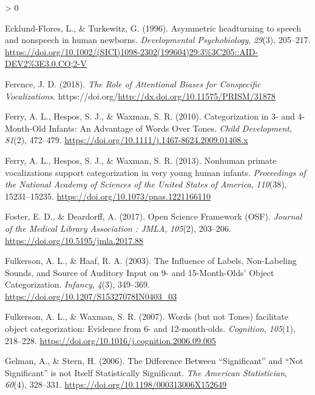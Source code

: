 \documentclass[
  english,
  man]{apa6}
\newlength{\cslhangindent}
\newenvironment{CSLReferences}[2] %
 {%
  \setlength{\parindent}{0pt}
  \ifodd #1 \everypar{\setlength{\hangindent}{\cslhangindent}}\ignorespaces\fi
  \ifnum #2 > 0
  \setlength{\parskip}{#2\baselineskip}
  \fi
 }%
 {}
\begin{document}
\begin{CSLReferences}{1}{0}
\leavevmode\hypertarget{ref-ecklund-flores_asymmetric_1996}{}%
Ecklund-Flores, L., \& Turkewitz, G. (1996). Asymmetric headturning to speech and nonspeech in human newborns. \emph{Developmental Psychobiology}, \emph{29}(3), 205--217. \url{https://doi.org/10.1002/(SICI)1098-2302(199604)29:3\%3C205::AID-DEV2\%3E3.0.CO;2-V}

\leavevmode\hypertarget{ref-ference_role_2018}{}%
Ference, J. D. (2018). \emph{The {Role} of {Attentional} {Biases} for {Conspecific} {Vocalizations}}. https://doi.org/\url{http://dx.doi.org/10.11575/PRISM/31878}

\leavevmode\hypertarget{ref-ferry_categorization_2010}{}%
Ferry, A. L., Hespos, S. J., \& Waxman, S. R. (2010). Categorization in 3- and 4-{Month}-{Old} {Infants}: {An} {Advantage} of {Words} {Over} {Tones}. \emph{Child Development}, \emph{81}(2), 472--479. \url{https://doi.org/10.1111/j.1467-8624.2009.01408.x}

\leavevmode\hypertarget{ref-ferry_nonhuman_2013}{}%
Ferry, A. L., Hespos, S. J., \& Waxman, S. R. (2013). Nonhuman primate vocalizations support categorization in very young human infants. \emph{Proceedings of the National Academy of Sciences of the United States of America}, \emph{110}(38), 15231--15235. \url{https://doi.org/10.1073/pnas.1221166110}

\leavevmode\hypertarget{ref-foster_open_2017}{}%
Foster, E. D., \& Deardorff, A. (2017). Open {Science} {Framework} ({OSF}). \emph{Journal of the Medical Library Association : JMLA}, \emph{105}(2), 203--206. \url{https://doi.org/10.5195/jmla.2017.88}

\leavevmode\hypertarget{ref-fulkerson_influence_2003}{}%
Fulkerson, A. L., \& Haaf, R. A. (2003). The {Influence} of {Labels}, {Non}-{Labeling} {Sounds}, and {Source} of {Auditory} {Input} on 9- and 15-{Month}-{Olds}' {Object} {Categorization}. \emph{Infancy}, \emph{4}(3), 349--369. \url{https://doi.org/10.1207/S15327078IN0403_03}

\leavevmode\hypertarget{ref-fulkerson_words_2007}{}%
Fulkerson, A. L., \& Waxman, S. R. (2007). Words (but not {Tones}) facilitate object categorization: {Evidence} from 6- and 12-month-olds. \emph{Cognition}, \emph{105}(1), 218--228. \url{https://doi.org/10.1016/j.cognition.2006.09.005}

\leavevmode\hypertarget{ref-gelman_difference_2006}{}%
Gelman, A., \& Stern, H. (2006). The {Difference} {Between} {``{Significant}''} and {``{Not} {Significant}''} is not {Itself} {Statistically} {Significant}. \emph{The American Statistician}, \emph{60}(4), 328--331. \url{https://doi.org/10.1198/000313006X152649}


\end{CSLReferences}
\end{document}
